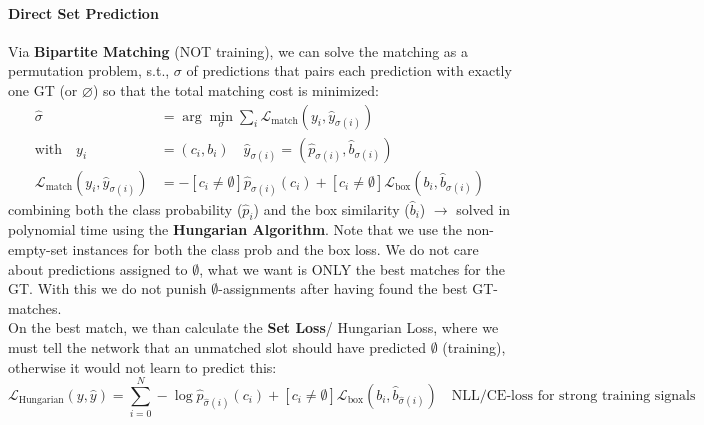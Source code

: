\documentclass{article}
\begin{document}
\paragraph{Direct Set Prediction}
Via \textbf{Bipartite Matching} (NOT training), we can solve the matching as a permutation problem, s.t., $\sigma$ of predictions that pairs each prediction with exactly one GT (or $\varnothing$) so that the total matching cost is minimized:
\begin{align*}
    \hat{\sigma} &= \arg\min_\sigma \sum_i \mathcal{L}_\text{match}(y_i, \hat{y}_{\sigma(i)})\\
    \text{with}\quad y_i &= (c_i,b_i) \quad \hat{y}_{\sigma(i)}=(\hat{p}_{\sigma(i)}, \hat{b}_{\sigma(i)})\\
    \mathcal{L}_\text{match}(y_i, \hat{y}_{\sigma(i)}) &= -[c_i \neq \emptyset] \hat{p}_{\sigma(i)}(c_i)+ [c_i \neq \emptyset]\mathcal{L}_{\text{box}}(b_i, \hat{b}_{\sigma(i)})
\end{align*}
combining both the class probability ($\hat{p}_i$) and the box similarity ($\hat{b}_i$) $\rightarrow$ solved in polynomial time using the \textbf{Hungarian Algorithm}. Note that we use the non-empty-set instances for both the class prob and the box loss. 
We do not care about predictions assigned to $\emptyset$, what we want is ONLY the best matches for the GT. With this we do not punish $\emptyset$-assignments after having found the best GT-matches.\\

On the best match, we than calculate the \textbf{Set Loss}/ Hungarian Loss, where we must tell the network that an unmatched slot should have predicted $\emptyset$ (training), otherwise it would not learn to predict this:
$$
\mathcal{L}_{\text{Hungarian}}(y,\hat{y})=\sum_{i=0}^N-\log \hat{p}_{\hat{\sigma}(i)}(c_i) +[c_i\neq \emptyset]\mathcal{L}_{\text{box}}(b_i,\hat{b}_{\hat{\sigma}(i)}) \quad \text{NLL/CE-loss for strong training signals}
$$
\end{document}
